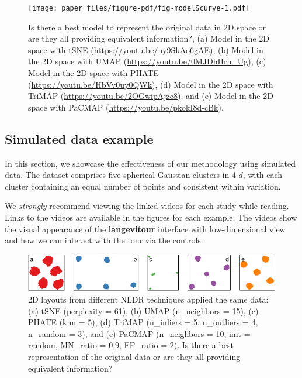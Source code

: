 \documentclass[
  12pt]{article}
\begin{document}
\begin{figure}

{\centering \texttt{[image: paper\_files/figure-pdf/fig-modelScurve-1.pdf]}

}

\caption{\label{fig-modelScurve}Is there a best model to represent the
original data in 2D space or are they all providing equivalent
information?, (a) Model in the 2D space with tSNE
(\url{https://youtu.be/uy9SkAo6gAE}), (b) Model in the 2D space with
UMAP (\url{https://youtu.be/0MJDhHrh_Ug}), (c) Model in the 2D space
with PHATE (\url{https://youtu.be/HbVv0uy0QWk}), (d) Model in the 2D
space with TriMAP (\url{https://youtu.be/2OGwipAjzc8}), and (e) Model in
the 2D space with PaCMAP (\url{https://youtu.be/pkokI8d-cBk}).}

\end{figure}

\hypertarget{sec-simpleex}{%
\subsection{Simulated data example}\label{sec-simpleex}}

In this section, we showcase the effectiveness of our methodology using
simulated data. The dataset comprises five spherical Gaussian clusters
in 4-\(d\), with each cluster containing an equal number of points and
consistent within variation.

We \emph{strongly} recommend viewing the linked videos for each study
while reading. Links to the videos are available in the figures for each
example. The videos show the visual appearance of the
\textbf{langevitour} interface with low-dimensional view and how we can
interact with the tour via the controls.

\begin{figure}

{\centering \includegraphics[width=1\textwidth,height=\textheight]{paper_files/figure-pdf/fig-nldervis5Gau-1.pdf}

}

\caption{\label{fig-nldervis5Gau}2D layouts from different NLDR
techniques applied the same data: (a) tSNE (perplexity = 61), (b) UMAP
(n\_neighbors = 15), (c) PHATE (knn = 5), (d) TriMAP (n\_inliers = 5,
n\_outliers = 4, n\_random = 3), and (e) PaCMAP (n\_neighbors = 10, init
= random, MN\_ratio = 0.9, FP\_ratio = 2). Is there a best
representation of the original data or are they all providing equivalent
information?}

\end{figure}
\end{document}
